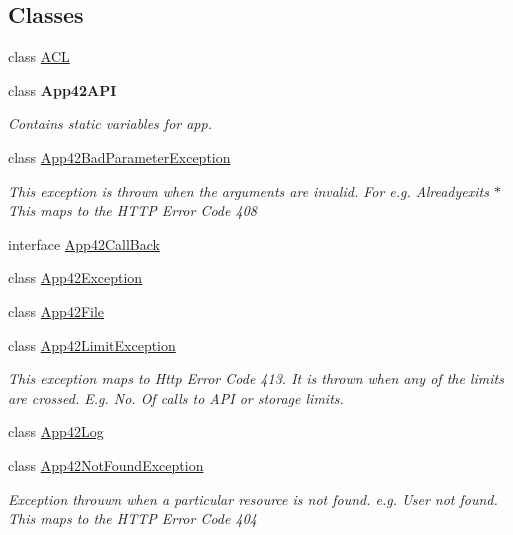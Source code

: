 \subsection*{Classes}
\begin{DoxyCompactItemize}
\item 
class \hyperlink{classcom_1_1shephertz_1_1app42_1_1paas_1_1sdk_1_1csharp_1_1_a_c_l}{A\+C\+L}
\item 
class {\bfseries App42\+A\+P\+I}
\begin{DoxyCompactList}\small\item\em Contains static variables for app. \end{DoxyCompactList}\item 
class \hyperlink{classcom_1_1shephertz_1_1app42_1_1paas_1_1sdk_1_1csharp_1_1_app42_bad_parameter_exception}{App42\+Bad\+Parameter\+Exception}
\begin{DoxyCompactList}\small\item\em This exception is thrown when the arguments are invalid. For e.\+g. Alreadyexits $\ast$ This maps to the H\+T\+T\+P Error Code 408 \end{DoxyCompactList}\item 
interface \hyperlink{interfacecom_1_1shephertz_1_1app42_1_1paas_1_1sdk_1_1csharp_1_1_app42_call_back}{App42\+Call\+Back}
\item 
class \hyperlink{classcom_1_1shephertz_1_1app42_1_1paas_1_1sdk_1_1csharp_1_1_app42_exception}{App42\+Exception}
\item 
class \hyperlink{classcom_1_1shephertz_1_1app42_1_1paas_1_1sdk_1_1csharp_1_1_app42_file}{App42\+File}
\item 
class \hyperlink{classcom_1_1shephertz_1_1app42_1_1paas_1_1sdk_1_1csharp_1_1_app42_limit_exception}{App42\+Limit\+Exception}
\begin{DoxyCompactList}\small\item\em This exception maps to Http Error Code 413. It is thrown when any of the limits are crossed. E.\+g. No. Of calls to A\+P\+I or storage limits. \end{DoxyCompactList}\item 
class \hyperlink{classcom_1_1shephertz_1_1app42_1_1paas_1_1sdk_1_1csharp_1_1_app42_log}{App42\+Log}
\item 
class \hyperlink{classcom_1_1shephertz_1_1app42_1_1paas_1_1sdk_1_1csharp_1_1_app42_not_found_exception}{App42\+Not\+Found\+Exception}
\begin{DoxyCompactList}\small\item\em Exception throuwn when a particular resource is not found. e.\+g. User not found. This maps to the H\+T\+T\+P Error Code 404 \end{DoxyCompactList}\item 

\end{DoxyCompactItemize}
